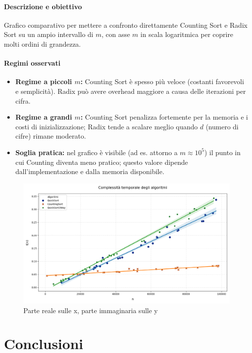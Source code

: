 \documentclass[a4paper, 11pt]{article}
\begin{document}
\paragraph{Descrizione e obiettivo}
Grafico comparativo per mettere a confronto direttamente Counting Sort e Radix Sort su un ampio intervallo di \(m\), con asse \(m\) in scala logaritmica per coprire molti ordini di grandezza.

\paragraph{Regimi osservati}
\begin{itemize}
  \item \textbf{Regime a piccoli \(m\):} Counting Sort è spesso più veloce (costanti favorevoli e semplicità). Radix può avere overhead maggiore a causa delle iterazioni per cifra.
  \item \textbf{Regime a grandi \(m\):} Counting Sort penalizza fortemente per la memoria e i costi di inizializzazione; Radix tende a scalare meglio quando \(d\) (numero di cifre) rimane moderato.
  \item \textbf{Soglia pratica:} nel grafico è visibile (ad es. attorno a \(m\approx 10^5\)) il punto in cui Counting diventa meno pratico; questo valore dipende dall'implementazione e dalla memoria disponibile.
\end{itemize}

\begin{figure} [H]
    \centering
    \includegraphics[scale=0.5]{Immagini/Grafico.png}
    \caption*{Parte reale sulle x, parte immaginaria sulle y}
\end{figure}

\section{Conclusioni}
\end{document}
